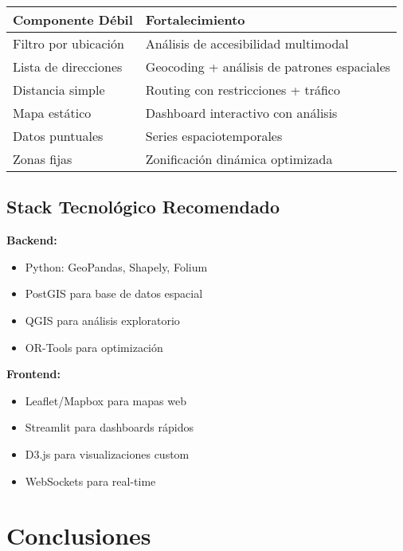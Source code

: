 \documentclass[11pt,a4paper]{article}
\begin{document}
\begin{table}[h]
\centering
\begin{tabular}{ll}
\toprule
\textbf{Componente Débil} & \textbf{Fortalecimiento} \\
\midrule
Filtro por ubicación & Análisis de accesibilidad multimodal \\
Lista de direcciones & Geocoding + análisis de patrones espaciales \\
Distancia simple & Routing con restricciones + tráfico \\
Mapa estático & Dashboard interactivo con análisis \\
Datos puntuales & Series espaciotemporales \\
Zonas fijas & Zonificación dinámica optimizada \\
\bottomrule
\end{tabular}
\end{table}

\subsection{Stack Tecnológico Recomendado}

\begin{multicols}{2}
\textbf{Backend:}
\begin{itemize}
    \item Python: GeoPandas, Shapely, Folium
    \item PostGIS para base de datos espacial
    \item QGIS para análisis exploratorio
    \item OR-Tools para optimización
\end{itemize}

\columnbreak

\textbf{Frontend:}
\begin{itemize}
    \item Leaflet/Mapbox para mapas web
    \item Streamlit para dashboards rápidos
    \item D3.js para visualizaciones custom
    \item WebSockets para real-time
\end{itemize}
\end{multicols}

\section{Conclusiones}
\end{document}
